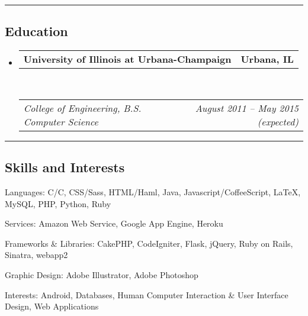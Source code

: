 \documentclass[10pt,letterpaper]{article}
\makeatletter
\newcommand{\headerrow}[2]
{\begin{tabular*}{\linewidth}{l@{\extracolsep{\fill}}r}
	#1 &
	#2 \\
\end{tabular*}}
\newcommand{\CPP}
{C\nolinebreak[4]\hspace{-.05em}\raisebox{.22ex}{\footnotesize\bf ++}}
\makeatother
\begin{document}
\hrule
\vspace{-0.4em}
\subsection*{Education}

\begin{itemize}
	\parskip=0.1em

	\item
	\headerrow
		{\textbf{University of Illinois at Urbana-Champaign}}
		{\textbf{Urbana, IL}}
	\\
	\headerrow
		{\emph{College of Engineering, B.S. Computer Science}}
		{\emph{August 2011 -- May 2015 (expected)}}

\end{itemize}


\hrule
\vspace{-0.4em}
\subsection*{Skills and Interests}

\begin{description*}
	\item[Languages:]
       C/\CPP, CSS/Sass, HTML/Haml, Java, Javascript/CoffeeScript, \LaTeX, MySQL, PHP, Python, Ruby
	\item[Services:]
	Amazon Web Service, Google App Engine, Heroku
	\item[Frameworks \& Libraries:]
	CakePHP, CodeIgniter, Flask, jQuery, Ruby on Rails, Sinatra, webapp2
	\item[Graphic Design:]
	Adobe Illustrator, Adobe Photoshop
	\item[Interests:]
	Android, Databases, Human Computer Interaction \& User Interface Design, Web
	Applications
\end{description*}
\end{document}
